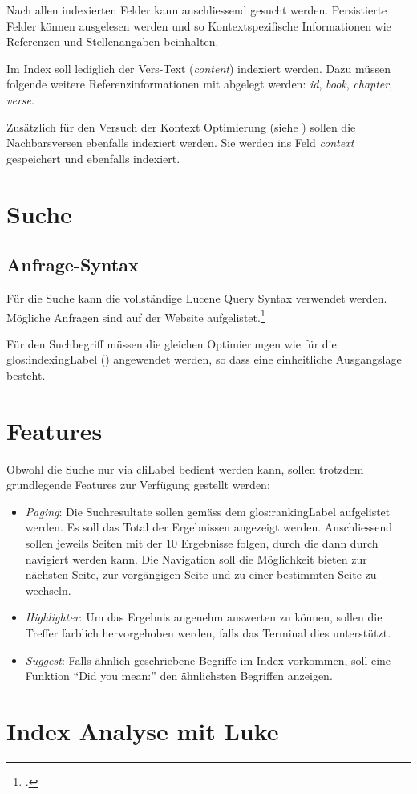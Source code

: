 Nach allen indexierten Felder kann anschliessend gesucht werden. Persistierte Felder können ausgelesen werden und so Kontextspezifische Informationen wie Referenzen und Stellenangaben beinhalten.

Im Index soll lediglich der Vers-Text (\textit{content}) indexiert werden.
Dazu müssen folgende weitere Referenzinformationen mit abgelegt werden: \textit{id}, \textit{book}, \textit{chapter}, \textit{verse}.

Zusätzlich für den Versuch der Kontext Optimierung (siehe ) sollen die Nachbarsversen ebenfalls indexiert werden. Sie werden ins Feld \textit{context} gespeichert und ebenfalls indexiert.


\section{Suche}
\subsection{Anfrage-Syntax}
Für die Suche kann die vollständige Lucene Query Syntax verwendet werden. Mögliche Anfragen sind auf der Website aufgelistet.\footcite{Lucene_Query_Syntax_Lucene_Tutorial_2016-05-09}

Für den Suchbegriff müssen die gleichen Optimierungen wie für die \gls{glos:indexingLabel} () angewendet werden, so dass eine einheitliche Ausgangslage besteht.

\section{Features}
Obwohl die Suche nur via \gls{cliLabel} bedient werden kann, sollen trotzdem grundlegende Features zur Verfügung gestellt werden:
\begin{itemize}
	\item \textit{Paging}:
	Die Suchresultate sollen gemäss dem \gls{glos:rankingLabel} aufgelistet werden. Es soll das Total der Ergebnissen angezeigt werden. Anschliessend sollen jeweils Seiten mit der 10 Ergebnisse folgen, durch die dann durch navigiert werden kann.
	Die Navigation soll die Möglichkeit bieten zur nächsten Seite, zur vorgängigen Seite und zu einer bestimmten Seite zu wechseln.
	
	\item \textit{Highlighter}:
	Um das Ergebnis angenehm auswerten zu können, sollen die Treffer farblich hervorgehoben werden, falls das Terminal dies unterstützt.

	\item \textit{Suggest}:
	Falls ähnlich geschriebene Begriffe im Index vorkommen, soll eine Funktion "`Did you mean:"' den ähnlichsten Begriffen anzeigen.
	
	
\end{itemize}

\section{Index Analyse mit Luke}
